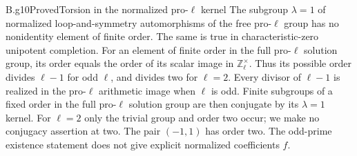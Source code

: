 \begin{claim}{B.g10}{Proved}{Torsion in the normalized pro-$\ell$ kernel}
The subgroup $\lambda=1$ of normalized loop-and-symmetry automorphisms
of the free pro-$\ell$ group has no nonidentity element of finite
order.  The same is true in characteristic-zero unipotent completion.
For an element of finite order in the full pro-$\ell$ solution group,
its order equals the order of its scalar image in
$\mathbb Z_\ell^\times$.  Thus its possible order divides $\ell-1$
for odd $\ell$, and divides two for $\ell=2$.
Every divisor of $\ell-1$ is realized in the pro-$\ell$ arithmetic
image when $\ell$ is odd.  Finite subgroups of a fixed order in the
full pro-$\ell$ solution group are then conjugate by its $\lambda=1$
kernel.  For $\ell=2$ only the trivial group and order two occur;
we make no conjugacy assertion at two.  The pair $(-1,1)$ has order two.
The odd-prime existence statement does not give explicit normalized
coefficients $f$.
\end{claim}

